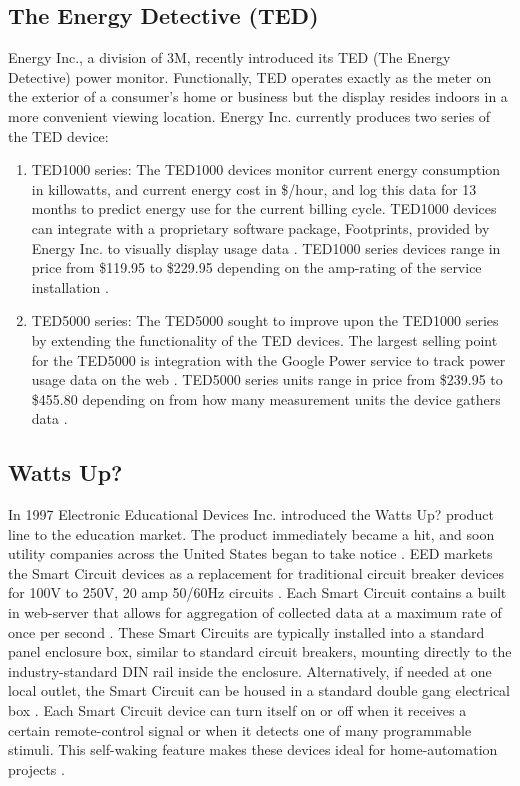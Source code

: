 \subsection{The Energy Detective (TED)} %
Energy Inc., a division of 3M, recently introduced its TED (The Energy Detective) power monitor. Functionally, TED operates exactly as the meter on the exterior of a consumer's home or business but the display resides indoors in a more convenient viewing location. Energy Inc. currently produces two series of the TED device:
\begin{enumerate}
\item TED1000 series: The TED1000 devices monitor current energy consumption in killowatts, and current energy cost in \$/hour, and log this data for 13 months to predict energy use for the current billing cycle. TED1000 devices can integrate with a proprietary software package, Footprints, provided by Energy Inc. to visually display usage data \cite{TED1000}. TED1000 series devices range in price from \$119.95 to \$229.95 depending on the amp-rating of the service installation \cite{TED1000Store}.
\item TED5000 series: The TED5000 sought to improve upon the TED1000 series by extending the functionality of the TED devices. The largest selling point for the TED5000 is integration with the Google Power service to track power usage data on the web \cite{TED5000}. TED5000 series units range in price from \$239.95 to \$455.80 depending on from how many measurement units the device gathers data \cite{TED5000Store}.
\end{enumerate}

\subsection{Watts Up?}%
In 1997 Electronic Educational Devices Inc. introduced the Watts Up? product line to the education market. The product immediately became a hit, and soon utility companies across the United States began to take notice \cite{WattsAbout}. EED markets the Smart Circuit devices as a replacement for traditional circuit breaker devices for 100V to 250V, 20 amp 50/60Hz circuits \cite{WattsUpDatasheet}. Each Smart Circuit contains a built in web-server that allows for aggregation of collected data at a maximum rate of once per second \cite{WattsUpDatasheet}. These Smart Circuits are typically installed into a standard panel enclosure box, similar to standard circuit breakers, mounting directly to the industry-standard DIN rail inside the enclosure\cite{WattsUpDatasheet}. Alternatively, if needed at one local outlet, the Smart Circuit can be housed in a standard double gang electrical box \cite{WattsUpdatasheet}. Each Smart Circuit device can turn itself on or off when it receives a certain remote-control signal or when it detects one of many programmable stimuli. This self-waking feature makes these devices ideal for home-automation projects \cite{WattsUpDatasheet}.

